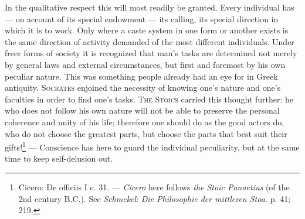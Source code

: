 \documentclass[12pt,a4paper,openany]{book}
\begin{document}
In the qualitative respect this will most readily be granted. Every individual has --- on account of
its special endowment --- its calling, its special direction in which it is to work. Only where a
caste system in one form or another exists is the same direction of activity demanded of the most
different individuals. Under freer forms of society it is recognized that man's tasks are determined not
merely by general laws and external circumstances, but first and foremost by his own peculiar nature.
This was something people already had an eye for in Greek antiquity. \textsc{Socrates} enjoined the
necessity of knowing one's nature and one's faculties in order to find one's tasks. \textsc{The Stoics}
carried this thought further: he who does not follow his own nature will not be able to preserve the
personal coherence and unity of his life; therefore one should do as the good actors do, who do not
choose the greatest parts, but choose the parts that best suit their gifts!\footnote[1]{Cicero: De
officiis I c. 31. --- \emph{Cicero} here follows \emph{the Stoic Panaetius} (of the 2nd century B.C.).
See \emph{Schmekel}: \textit{Die Philosophie der mittleren Stoa.} p. 41; 219.} --- Conscience has here
to guard the individual peculiarity, but at the same time to keep self-delusion out.
\end{document}

